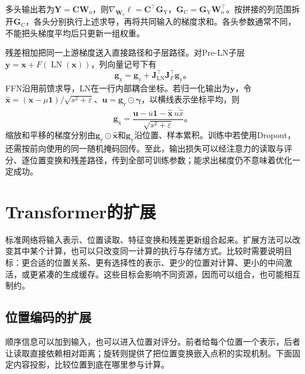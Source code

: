 多头输出若为$\bm Y=\bm C\bm W_{\mathrm o}$，则$\nabla_{\bm W_{\mathrm o}}\ell=\bm C^{\top}\bm G_{\mathrm Y}$，$\bm G_{\mathrm C}=\bm G_{\mathrm Y}\bm W_{\mathrm o}^{\top}$。按拼接的列范围拆开$\bm G_{\mathrm C}$，各头分别执行上述求导，再将共同输入的梯度求和。各头参数通常不同，不能把头梯度平均后只更新一组权重。

残差相加把同一上游梯度送入直接路径和子层路径。对Pre-LN子层$\bm y=\bm x+F(\operatorname{LN}(\bm x))$，列向量记号下有
\begin{equation}
  \bm g_{\mathrm x}=\bm g_{\mathrm y}
     +\bm J_{\operatorname{LN}}^{\top}\bm J_F^{\top}\bm g_{\mathrm y}\text{。}
  \label{eq:transformer-preln-gradient}
\end{equation}
FFN沿用前馈求导，LN在一行内部耦合坐标。若归一化输出为$\bm y$，令$\widehat{\bm x}=(\bm x-\mu\bm1)/\sqrt{s^2+\varepsilon}$、$\bm u=\bm g_{\mathrm y}\odot\bm\gamma$，以横线表示坐标平均，则
\begin{equation}
  \bm g_{\mathrm x}
   =\frac{\bm u-\overline u\bm1
             -\widehat{\bm x}\,\overline{u\widehat x}}
          {\sqrt{s^2+\varepsilon}}\text{。}
  \label{eq:transformer-layernorm-gradient}
\end{equation}
缩放和平移的梯度分别由$\bm g_{\mathrm y}\odot\widehat{\bm x}$和$\bm g_{\mathrm y}$沿位置、样本累积。训练中若使用Dropout，还需按前向使用的同一随机掩码回传。至此，输出损失可以经注意力的读取与评分、逐位置变换和残差路径，传到全部可训练参数；能求出梯度仍不意味着优化一定成功。

\section{Transformer的扩展}
\label{sec:transformer-extensions}

标准网络将输入表示、位置读取、特征变换和残差更新组合起来。扩展方法可以改变其中某个计算，也可以只改变同一计算的执行与存储方式。比较时需要说明目标：更合适的位置关系、更有选择性的表示、更少的位置对计算、更小的中间激活，或更紧凑的生成缓存。这些目标会影响不同资源，因而可以组合，也可能相互制约。

\subsection{位置编码的扩展}
\label{sec:transformer-position-extensions}

顺序信息可以加到输入，也可以进入位置对评分。前者给每个位置一个表示，后者让读取直接依赖相对距离；旋转则提供了把位置变换嵌入点积的实现机制。下面固定内容投影，比较位置到底在哪里参与计算。

